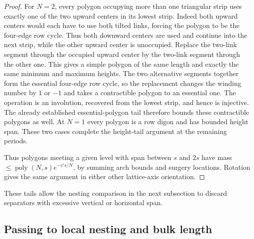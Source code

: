 \begin{proof}
For $N=2$, every polygon occupying more than one triangular strip uses exactly one of the two upward centers in its lowest strip. Indeed both upward centers would each have to use both tilted links, forcing the polygon to be the four-edge row cycle. Thus both downward centers are used and continue into the next strip, while the other upward center is unoccupied. Replace the two-link segment through the occupied upward center by the two-link segment through the other one. This gives a simple polygon of the same length and exactly the same minimum and maximum heights. The two alternative segments together form the essential four-edge row cycle, so the replacement changes the winding number by $1$ or $-1$ and takes a contractible polygon to an essential one. The operation is an involution, recovered from the lowest strip, and hence is injective. The already established essential-polygon tail therefore bounds these contractible polygons as well. At $N=1$ every polygon is a row digon and has bounded height span. These two cases complete the height-tail argument at the remaining periods.

Thus polygons meeting a given level with span between \(s\) and \(2s\) have mass \(\le\operatorname{poly}(N,s)e^{-c' s/N}\), by summing arch bounds and surgery locations. Rotation gives the same argument in either other lattice-axis orientation.
\end{proof}
These tails allow the nesting comparison in the next subsection to discard separators with excessive vertical or horizontal span.

\subsection{Passing to local nesting and bulk length}\label{c6:subheading-13}

